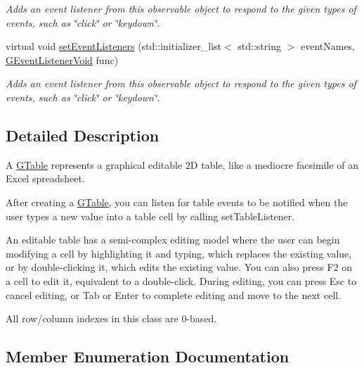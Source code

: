 \begin{DoxyCompactItemize}
\begin{DoxyCompactList}\small\item\em Adds an event listener from this observable object to respond to the given types of events, such as \char`\"{}click\char`\"{} or \char`\"{}keydown\char`\"{}. \end{DoxyCompactList}\item 
virtual void \mbox{\hyperlink{classsgl_1_1GObservable_a7867184bbb686f74fae8a4db927da799}{set\+Event\+Listeners}} (std\+::initializer\+\_\+list$<$ std\+::string $>$ event\+Names, \mbox{\hyperlink{namespacesgl_a54427ce97bb1c2804e4fe2b0a62e8b17}{G\+Event\+Listener\+Void}} func)
\begin{DoxyCompactList}\small\item\em Adds an event listener from this observable object to respond to the given types of events, such as \char`\"{}click\char`\"{} or \char`\"{}keydown\char`\"{}. \end{DoxyCompactList}\end{DoxyCompactItemize}


\subsection{Detailed Description}
A \mbox{\hyperlink{classsgl_1_1GTable}{G\+Table}} represents a graphical editable 2D table, like a mediocre facsimile of an Excel spreadsheet. 

After creating a \mbox{\hyperlink{classsgl_1_1GTable}{G\+Table}}, you can listen for table events to be notified when the user types a new value into a table cell by calling set\+Table\+Listener.

An editable table has a semi-\/complex editing model where the user can begin modifying a cell by highlighting it and typing, which replaces the existing value, or by double-\/clicking it, which edits the existing value. You can also press F2 on a cell to edit it, equivalent to a double-\/click. During editing, you can press Esc to cancel editing, or Tab or Enter to complete editing and move to the next cell.

All row/column indexes in this class are 0-\/based. 

\subsection{Member Enumeration Documentation}
\mbox{\label{classsgl_1_1GTable_a060cff504451bbb98530e64e936e2671}} 
